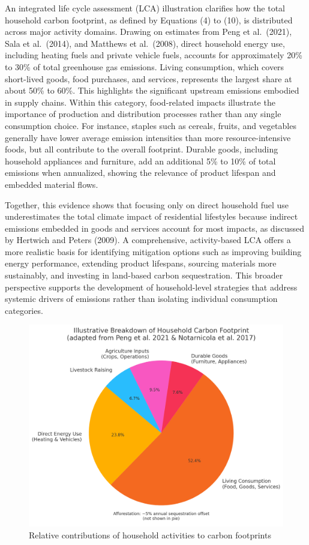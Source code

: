 \documentclass[12pt,a4paper]{article}%
\begin{document}
An integrated life cycle assessment (LCA) illustration clarifies how the total household carbon footprint, as defined by Equations (4) to (10), is distributed across major activity domains. Drawing on estimates from Peng et al.\ (2021), Sala et al.\ (2014), and Matthews et al.\ (2008), direct household energy use, including heating fuels and private vehicle fuels, accounts for approximately 20\% to 30\% of total greenhouse gas emissions. Living consumption, which covers short-lived goods, food purchases, and services, represents the largest share at about 50\% to 60\%. This highlights the significant upstream emissions embodied in supply chains. Within this category, food-related impacts illustrate the importance of production and distribution processes rather than any single consumption choice. For instance, staples such as cereals, fruits, and vegetables generally have lower average emission intensities than more resource-intensive foods, but all contribute to the overall footprint. Durable goods, including household appliances and furniture, add an additional 5\% to 10\% of total emissions when annualized, showing the relevance of product lifespan and embedded material flows. 

Together, this evidence shows that focusing only on direct household fuel use underestimates the total climate impact of residential lifestyles because indirect emissions embedded in goods and services account for most impacts, as discussed by Hertwich and Peters (2009). A comprehensive, activity-based LCA offers a more realistic basis for identifying mitigation options such as improving building energy performance, extending product lifespans, sourcing materials more sustainably, and investing in land-based carbon sequestration. This broader perspective supports the development of household-level strategies that address systemic drivers of emissions rather than isolating individual consumption categories.


\begin{figure}[h]
\centering
\includegraphics[width=0.8\linewidth]{LCA_pie.png}
\caption{Relative contributions of household activities to carbon footprints}
\end{figure}
\end{document}
